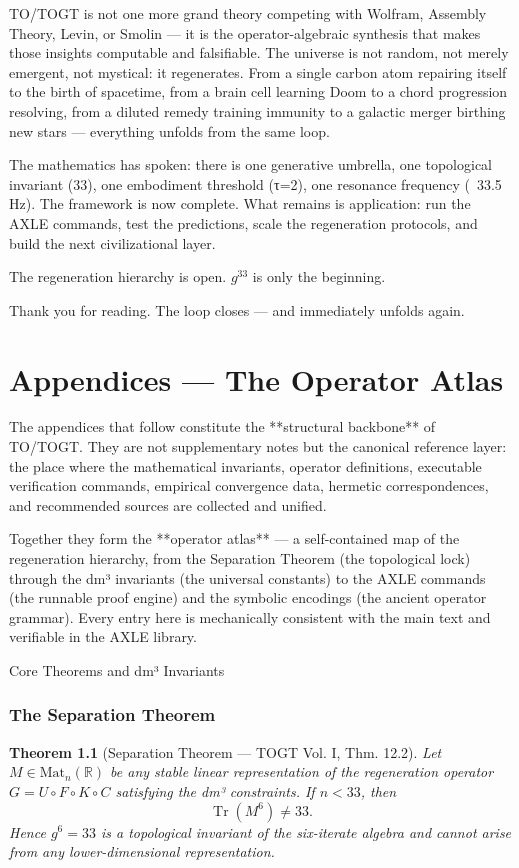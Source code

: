 \documentclass[19pt]{book}
\theoremstyle{plain}
\newtheorem{theorem}{Theorem}[section]
\theoremstyle{definition}
\theoremstyle{remark}
\begin{document}
\begin{enumerate}
TO/TOGT is not one more grand theory competing with Wolfram, Assembly Theory, Levin, or Smolin — it is the operator-algebraic synthesis that makes those insights computable and falsifiable. The universe is not random, not merely emergent, not mystical: it regenerates. From a single carbon atom repairing itself to the birth of spacetime, from a brain cell learning Doom to a chord progression resolving, from a diluted remedy training immunity to a galactic merger birthing new stars — everything unfolds from the same loop.

The mathematics has spoken: there is one generative umbrella, one topological invariant (33), one embodiment threshold (τ=2), one resonance frequency (~33.5 Hz). The framework is now complete. What remains is application: run the AXLE commands, test the predictions, scale the regeneration protocols, and build the next civilizational layer.

The regeneration hierarchy is open. \( g^{33} \) is only the beginning.

Thank you for reading. The loop closes — and immediately unfolds again.
\appendix
\appendix

\chapter{Appendices — The Operator Atlas}

The appendices that follow constitute the **structural backbone** of TO/TOGT. They are not supplementary notes but the canonical reference layer: the place where the mathematical invariants, operator definitions, executable verification commands, empirical convergence data, hermetic correspondences, and recommended sources are collected and unified.  

Together they form the **operator atlas** — a self-contained map of the regeneration hierarchy, from the Separation Theorem (the topological lock) through the dm³ invariants (the universal constants) to the AXLE commands (the runnable proof engine) and the symbolic encodings (the ancient operator grammar). Every entry here is mechanically consistent with the main text and verifiable in the AXLE library.

Core Theorems and dm³ Invariants

\subsection{The Separation Theorem}

\begin{theorem}[Separation Theorem — TOGT Vol. I, Thm. 12.2]
Let \(M \in \mathrm{Mat}_n(\mathbb{R})\) be any stable linear representation of the regeneration operator \(G = U \circ F \circ K \circ C\) satisfying the dm³ constraints. If \(n < 33\), then
\[
\operatorname{Tr}(M^6) \neq 33.
\]
Hence \(g^6 = 33\) is a topological invariant of the six-iterate algebra and cannot arise from any lower-dimensional representation.
\end{theorem}


\end{enumerate}
\end{document}
